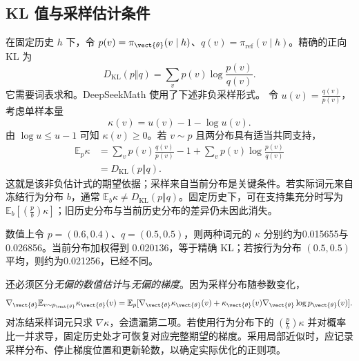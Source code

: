 \documentclass[../textbook.tex]{subfiles}
\begin{document}
\subsection{KL 值与采样估计条件}
在固定历史 $h$ 下，令 $p(v)=\pi_{\vect{\theta}}(v\mid h)$、$q(v)=\pi_{\mathrm{ref}}(v\mid h)$。精确的正向 KL 为
\begin{equation}
 D_{\mathrm{KL}}(p\Vert q)=\sum_v p(v)\log\frac{p(v)}{q(v)}.
\end{equation}
它需要词表求和。DeepSeekMath 使用了下述非负采样形式。\cite{shao2024deepseekmath} 令 $u(v)=\frac{q(v)}{p(v)}$，考虑单样本量
\begin{equation}
 \kappa(v)=u(v)-1-\log u(v).
 \label{eq:reason-kappa}
\end{equation}
由 $\log u\leq u-1$ 可知 $\kappa(v)\geq0$。若 $v\sim p$ 且两分布具有适当共同支持，
\begin{align}
 \mathbb E_p\kappa
 &=\sum_vp(v)\frac{q(v)}{p(v)}-1
   +\sum_vp(v)\log\frac{p(v)}{q(v)}\\
 &=D_{\mathrm{KL}}(p\Vert q).
\end{align}
这就是该非负估计式的期望依据；采样来自当前分布是关键条件。若实际词元来自冻结行为分布 $b$，通常 $\mathbb E_b\kappa\ne D_{\mathrm{KL}}(p\Vert q)$。固定历史下，可在支持集充分时写为 $\mathbb E_b[(\frac{p}{b})\kappa]$；旧历史分布与当前历史分布的差异仍未因此消失。

数值上令 $p=(0.6,0.4)$、$q=(0.5,0.5)$，则两种词元的 $\kappa$ 分别约为0.015655与0.026856。当前分布加权得到 $0.020136$，等于精确 KL；若按行为分布 $(0.5,0.5)$ 平均，则约为0.021256，已经不同。

还必须区分\emph{无偏的数值估计}与\emph{无偏的梯度}。因为采样分布随参数变化，
\begin{equation}
 \nabla_{\vect{\theta}}\mathbb E_{v\sim p_{\vect{\theta}}}\kappa_{\vect{\theta}}(v)
 =\mathbb E_p[\nabla_{\vect{\theta}}\kappa_{\vect{\theta}}(v)
 +\kappa_{\vect{\theta}}(v)\nabla_{\vect{\theta}}\log p_{\vect{\theta}}(v)].
\end{equation}
对冻结采样词元只求 $\nabla\kappa$，会遗漏第二项。若使用行为分布下的 $(\frac{p}{b})\kappa$ 并对概率比一并求导，固定历史处才可恢复对应完整期望的梯度。采用局部近似时，应记录采样分布、停止梯度位置和更新轮数，以确定实际优化的正则项。
\end{document}
